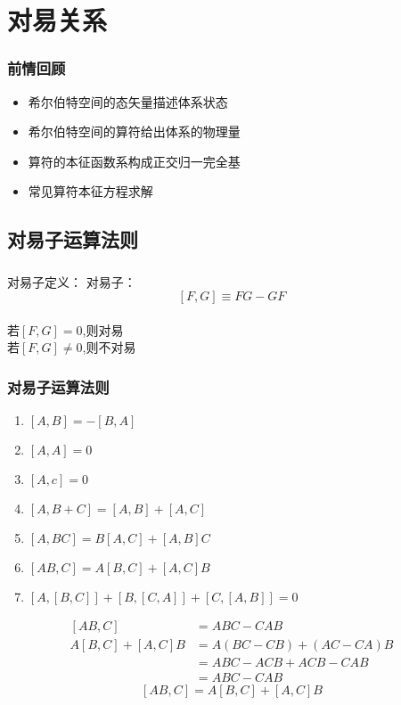 \section{对易关系}

\begin{frame}
    \frametitle{前情回顾}
    \begin{itemize}
        \item 希尔伯特空间的态矢量描述体系状态
        \item 希尔伯特空间的算符给出体系的物理量
        \item 算符的本征函数系构成正交归一完全基
        \item 常见算符本征方程求解
    \end{itemize}   
\end{frame} 

\subsection{对易子运算法则}

\begin{frame} 
    \frametitle{}
    \begin{atcbox}{对易子定义：}
        对易子：$$ [F,G]\equiv FG-GF $$ \\
        若$[F,G]=0$,则对易 \\
        若$[F,G]\neq0$,则不对易  
    \end{atcbox}
\end{frame} 

\begin{frame} 
    \frametitle{对易子运算法则}
    \begin{enumerate}
        \item  $[A,B]=-[B,A]$
        \item  $[A,A]=0$
        \item  $[A,c]=0$
        \item  $[A,B+C]=[A,B]+[A,C]$
        \item  $[A,BC]=B[A,C]+[A,B]C$
        \item  $[AB,C]=A[B,C]+[A,C]B$
        \item  $[A,[B,C]] + [B,[C,A]] + [C,[A,B]] =0$
    \end{enumerate}
\end{frame} 
\begin{frame}
     \证   
        \begin{equation*}
            \begin{split} 
            [AB,C]&=ABC-CAB \\
            A[B,C]+[A,C]B&=A(BC-CB)+(AC-CA)B\\
            &=ABC-ACB+ACB-CAB\\
            &=ABC-CAB
            \end{split}  
        \end{equation*}  
        $$ [AB,C]=A[B,C]+[A,C]B $$
     
\end{frame} 

